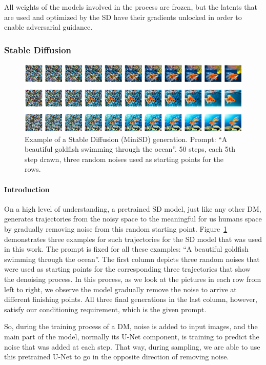 All weights of the models involved in the process are frozen, but the latents that are used and optimized by the SD have their gradients unlocked in order to enable adversarial guidance.

\subsubsection{Stable Diffusion}

\begin{figure}[ht!]
\centering
\includegraphics[width=150mm]{figures/sd_example_gf.png}
\caption{Example of a Stable Diffusion (MiniSD) generation. Prompt: ``A beautiful goldfish swimming through the ocean''. 50 steps, each 5th step drawn, three random noises used as starting points for the rows.}
\label{sd_generation_example}
\end{figure}

\paragraph{Introduction} On a high level of understanding, a pretrained SD model, just like any other DM, generates trajectories from the noisy space to the meaningful for us humans space by gradually removing noise from this random starting point. 
Figure~\ref{sd_generation_example} demonstrates three examples for such trajectories for the SD model that was used in this work.
The prompt is fixed for all these examples: ``A beautiful goldfish swimming through the ocean''.
The first column depicts three random noises that were used as starting points for the corresponding three trajectories that show the denoising process.
In this process, as we look at the pictures in each row from left to right, we observe the model gradually remove the noise to arrive at different finishing points. 
All three final generations in the last column, however, satisfy our conditioning requirement, which is the given prompt.

So, during the training process of a DM, noise is added to input images, and the main part of the model, normally its U-Net component, is training to predict the noise that was added at each step.
That way, during sampling, we are able to use this pretrained U-Net to go in the opposite direction of removing noise. 

